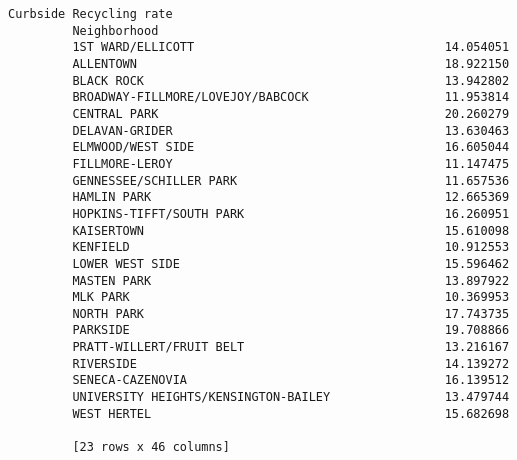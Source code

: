 \documentclass[11pt]{article}
\begin{document}
\begin{Verbatim}[commandchars=\\\{\}]
                                               Curbside Recycling rate  
         Neighborhood                                                   
         1ST WARD/ELLICOTT                                   14.054051  
         ALLENTOWN                                           18.922150  
         BLACK ROCK                                          13.942802  
         BROADWAY-FILLMORE/LOVEJOY/BABCOCK                   11.953814  
         CENTRAL PARK                                        20.260279  
         DELAVAN-GRIDER                                      13.630463  
         ELMWOOD/WEST SIDE                                   16.605044  
         FILLMORE-LEROY                                      11.147475  
         GENNESSEE/SCHILLER PARK                             11.657536  
         HAMLIN PARK                                         12.665369  
         HOPKINS-TIFFT/SOUTH PARK                            16.260951  
         KAISERTOWN                                          15.610098  
         KENFIELD                                            10.912553  
         LOWER WEST SIDE                                     15.596462  
         MASTEN PARK                                         13.897922  
         MLK PARK                                            10.369953  
         NORTH PARK                                          17.743735  
         PARKSIDE                                            19.708866  
         PRATT-WILLERT/FRUIT BELT                            13.216167  
         RIVERSIDE                                           14.139272  
         SENECA-CAZENOVIA                                    16.139512  
         UNIVERSITY HEIGHTS/KENSINGTON-BAILEY                13.479744  
         WEST HERTEL                                         15.682698  
         
         [23 rows x 46 columns]
\end{Verbatim}
            
\end{document}
